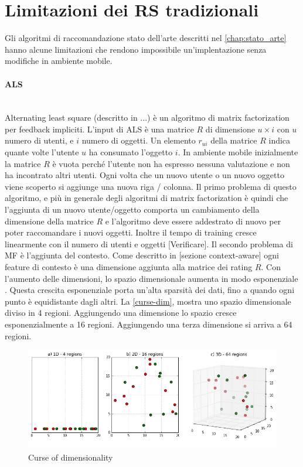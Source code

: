 \documentclass[12pt,italian]{report}
\newcommand{\myparagraph}[1]{\paragraph{#1}\mbox{}\\}
\begin{document}
\section{Limitazioni dei RS tradizionali}
Gli algoritmi di raccomandazione stato dell'arte descritti nel \autoref{chap:stato_arte} hanno alcune limitazioni che rendono impossibile un'implentazione senza modifiche in ambiente mobile.

\myparagraph{ALS}
Alternating least square (descritto in ...) è un algoritmo di matrix factorization per feedback impliciti. L'input di ALS è una matrice $R$ di dimensione $u \times i$ con $u$ numero di utenti, e $i$ numero di oggetti. Un elemento $r_{ui}$ della matrice $R$ indica quante volte l'utente $u$ ha consumato l'oggetto $i$. In ambiente mobile inizialmente la matrice $R$ è vuota perché l'utente non ha espresso nessuna valutazione e non ha incontrato altri utenti. Ogni volta che un nuovo utente o un nuovo oggetto viene scoperto si aggiunge una nuova riga / colonna. Il primo problema di questo algoritmo, e più in generale degli algoritmi di matrix factorization è quindi che l'aggiunta di un nuovo utente/oggetto comporta un cambiamento della dimensione della matrice $R$ e l'algoritmo deve essere addestrato di nuovo per poter raccomandare i nuovi oggetti. Inoltre il tempo di training cresce linearmente con il numero di utenti e oggetti [Verificare]. Il secondo problema di MF è l'aggiunta del contesto. Come descritto in [sezione context-aware] ogni feature di contesto è una dimensione aggiunta alla matrice dei rating $R$. Con l'aumento delle dimensioni, lo spazio dimensionale aumenta in modo esponenziale \cite{curse-of-dim}. Questa crescita esponenziale porta un'alta sparsità dei dati, fino a quando ogni punto è equidistante dagli altri. La \autoref{curse-dim}, mostra uno spazio dimensionale diviso in 4 regioni. Aggiungendo una dimensione lo spazio cresce esponenzialmente a 16 regioni. Aggiungendo una terza dimensione si arriva a 64 regioni.

\begin{figure}
  \includegraphics[width=\linewidth]{immagini/curse_of_dimensionality.png}
  \caption{Curse of dimensionality}
  \label{fig:curse-dim}
\end{figure}
\end{document}
